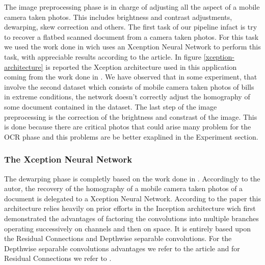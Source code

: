 \documentclass[10pt,twocolumn,letterpaper]{article}
\begin{document}
The image preprocessing phase is in charge of adjusting all the aspect
of a mobile camera taken photos. This includes brightness and contrast
adjustments, dewarping, skew correction and others. The first task of
our pipeline infact is try to recover a flatbed scanned document from
a camera taken photos. For this task we used the work done in
\cite{mobile-ocr} wich uses an Xcenption Neural Network
\cite{xception_NN} to perform this task, with appreciable results
according to the article. In figure \ref{xception-architecture} is
reported the Xception architecture used in this application coming
from the work done in \cite{Improvingcamera-based}. We have observed
that in some experiment, that involve the second dataset which
consists of mobile camera taken photos of bills in extreme conditions,
the network doesn't correctly adjust the homography of some document
contained in the dataset. The last step of the image preprocessing is
the correction of the brightness and constrast of the image. This is
done because there are critical photos that could arise many problem
for the OCR phase and this problems are be better exaplined in the
Experiment section.

\subsubsection{The Xception Neural Network}

The dewarping phase is completly based on the work done in
\cite{mobile-ocr}. Accordingly to the autor, the recovery of the
homography of a mobile camera taken photos of a document is delegated
to a Xception Neural Network. According to the paper \cite{xception}
this architecture relies heavily on prior efforts in the Inception
architecture wich first demonstrated the advantages of factoring the
convolutions into multiple branches operating successively on channels
and then on space. It is entirely based upon the Residual Connections
and Depthwise separable convolutions. For the Depthwise separable
convolutions advantages we refer to the article
\cite{https://towardsdatascience.com/a-basic-introduction-to-separable-convolutions-b99ec3102728}
and for Residual Connections we refer to
\cite{https://towardsdatascience.com/residual-blocks-building-blocks-of-resnet-fd90ca15d6ec}.
\end{document}
